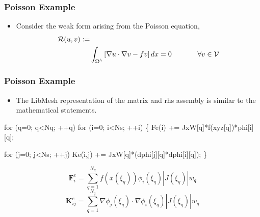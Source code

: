 \documentclass[mathserif]{beamer}
\newcommand{\bv}[1]{{\boldsymbol{#1}}}
\newcommand{\Res}{{\ensuremath{\mathcal R}}}
\begin{document}
\begin{frame}%
  \frametitle{Poisson Example}
  \begin{itemize}
  \item {Consider the weak form arising from the Poisson equation,
    \begin{eqnarray}
      \nonumber
      \Res( u, v ) := \hspace{2.5in} \\  \nonumber
      \int_{\Omega^h}  \left[ \nabla u \cdot \nabla v - f v \right] dx %
      =0 \hspace{.5in} \forall v \in \mathcal{V}
    \end{eqnarray}
  }
  \end{itemize}
\end{frame}


\begin{frame}[fragile,t]  
  \frametitle{Poisson Example}
	  \begin{itemize}    
	  \item{ The LibMesh representation of the matrix and
	    rhs assembly is similar to the mathematical statements.
	  }
	  \end{itemize}
\small
\begin{semiverbatim}
for (q=0; q<Nq; ++q) 
  for (i=0; i<Ns; ++i) \{
    \alert<2>{Fe(i)   += JxW[q]*f(xyz[q])*phi[i][q];}
    
    for (j=0; j<Ns; ++j)
      \alert<3>{Ke(i,j) += JxW[q]*(dphi[j][q]*dphi[i][q]);}
  \}
\end{semiverbatim}
{
  \begin{equation}
    \nonumber
    \bv{F}^e_{i} = 
    \sum_{q=1}^{N_q}
    f(x(\xi_q))
    \phi_i(\xi_q)
    |J(\xi_q)| w_q
  \end{equation}
}
{
  \begin{equation}
  \nonumber
  \bv{K}^e_{ij} =
  \sum_{q=1}^{N_q}
    \nabla \phi_j(\xi_q) \cdot
    \nabla \phi_i(\xi_q)
    |J(\xi_q)| w_q
  \end{equation}
}
\end{frame}
\end{document}
